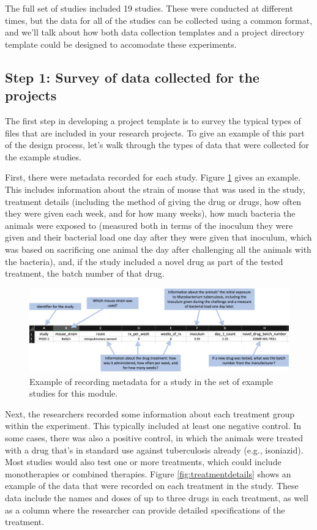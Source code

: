 \documentclass[]{tufte-book}
\begin{document}
The full set of studies included 19 studies. These were conducted at
different times, but the data for all of the studies can be collected using a
common format, and we'll talk about how both data collection templates and a
project directory template could be designed to accomodate these experiments.

\subsection{Step 1: Survey of data collected for the projects}\label{step-1-survey-of-data-collected-for-the-projects}

The first step in developing a project template is to survey the typical types
of files that are included in your research projects. To give an example of this
part of the design process, let's walk through the types of data that were
collected for the example studies.

First, there were metadata recorded for each study. Figure
\ref{fig:metadata} gives an example. This includes information about the strain
of mouse that was used in the study, treatment details (including the method of
giving the drug or drugs, how often they were given each week, and for how many
weeks), how much bacteria the animals were exposed to (measured both in terms of
the inoculum they were given and their bacterial load one day after they were
given that inoculum, which was based on sacrificing one animal the day after
challenging all the animals with the bacteria), and, if the study included a
novel drug as part of the tested treatment, the batch number of that drug.

\begin{figure}
\includegraphics[width=\textwidth]{figures/project_metadata} \caption[Example of recording metadata for a study in the set of example studies for this module]{Example of recording metadata for a study in the set of example studies for this module.}\label{fig:metadata}
\end{figure}

Next, the researchers recorded some information about each treatment group
within the experiment. This typically included at least one negative control. In
some cases, there was also a positive control, in which the animals were treated
with a drug that's in standard use against tuberculosis already (e.g.,
isoniazid). Most studies would also test one or more treatments, which could
include monotherapies or combined therapies. Figure \ref{fig:treatmentdetails}
shows an example of the data that were recorded on each treatment in the study.
These data include the names and doses of up to three drugs in each treatment,
as well as a column where the researcher can provide detailed specifications of
the treatment.
\end{document}
